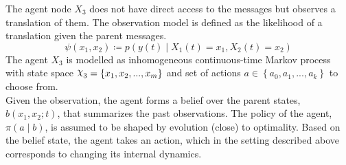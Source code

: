 The agent node $ X_3 $ does not have direct access to the messages but observes a translation of them. The observation model is defined as the likelihood of a translation given the parent messages.
\begin{equation}
\psi(x_1, x_2) \coloneqq p(y(t) \mid X_{1}(t)=x_1, X_{2}(t)=x_2)
\end{equation}
The agent  $ X_{3} $ is modelled as inhomogeneous continuous-time Markov process with state space $ \rchi_{3} = \left\lbrace x_{1}, x_{2}, ..., x_{m} \right\rbrace  $ and set of actions $ a \in \left\lbrace a_{0}, a_{1}, ..., a_{k}\right\rbrace  $ to choose from. \\
Given the observation, the agent forms a belief over the parent states, $  b(x_{1}, x_{2}; t) $, that summarizes the past observations. The policy of the agent, $ \pi(a \mid b) $, is assumed to be shaped by evolution (close) to optimality. Based on the belief state, the agent takes an action, which in the setting described above corresponds to changing its internal dynamics. 


